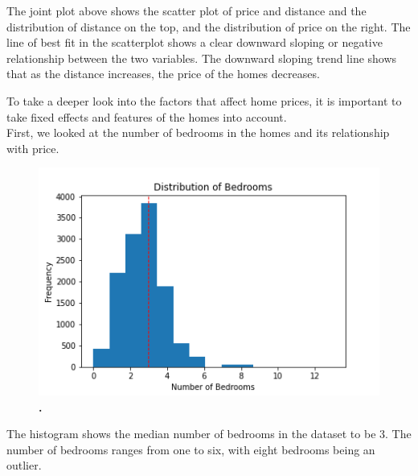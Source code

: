 \documentclass[12pt]{report}
\newcommand\tab[1][.50cm]{\hspace*{#1}}
\begin{document}
The joint plot above shows the scatter plot of price and distance and the distribution of distance on the top, and the distribution of price on the right. The line of best fit in the scatterplot shows a clear downward sloping or negative relationship between the two variables. The downward sloping trend line shows that as the distance increases, the price of the homes decreases. 
\clearpage

To take a deeper look into the factors that affect home prices, it is important to take fixed effects and features of the homes into account.\\
\tab First, we looked at the number of bedrooms in the homes and its relationship with price.
\begin{figure}[h]
\begin{center}
\includegraphics[width=130mm]{bedroomHist.png}
\end{center}
\caption{\textbf{.}}
\label{fig:bedHist}
\end{figure}
The histogram shows the median number of bedrooms in the dataset to be 3. The number of bedrooms ranges from one to six, with eight bedrooms being an outlier. 
\clearpage
\end{document}
